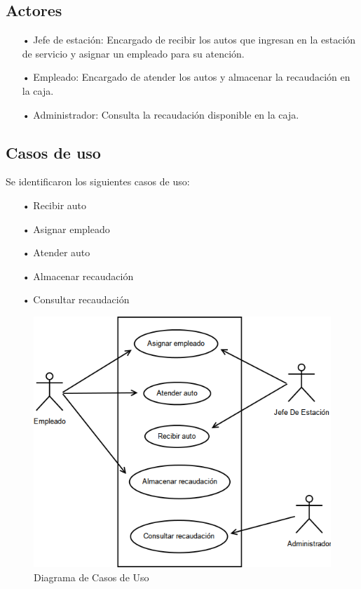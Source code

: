 \documentclass[12pt,a4paper,titlepage,oneside]{article}
\begin{document}
\subsection{Actores}
\begin{enumerate}
\item[•] Jefe de estación: Encargado de recibir los autos que ingresan en la estación de servicio y asignar un empleado para su atención.
\item[•] Empleado: Encargado de atender los autos y almacenar la recaudación en la caja.
\item[•] Administrador: Consulta la recaudación disponible en la caja.
\end{enumerate}

\subsection{Casos de uso}
Se identificaron los siguientes casos de uso:

\begin{enumerate}
\item[•] Recibir auto
\item[•] Asignar empleado
\item[•] Atender auto
\item[•] Almacenar recaudación
\item[•] Consultar recaudación
\end{enumerate}

\begin{figure}[hbtp]
\centering
\includegraphics[scale=0.6]{diagramaDeCasosDeUso.png} 
\caption{Diagrama de Casos de Uso}
\end{figure}
\end{document}
